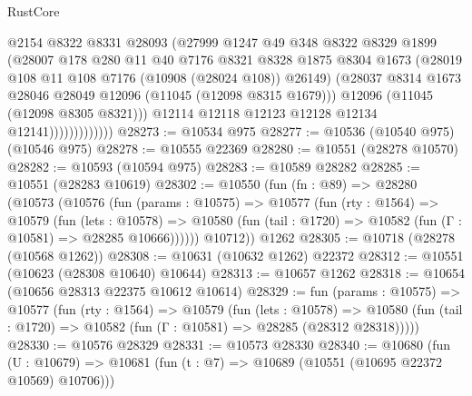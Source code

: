 \begin{lexlean}{RustCore}
\begin{coremodule}
                            @2154
                            @8322
                            @8331
                            @28093
                            (@27999
                              @1247
                              @49
                              @348
                              @8322
                              @8329
                              @1899
                              (@28007
                                @178
                                @280
                                @11
                                @40
                                @7176
                                @8321
                                @8328
                                @1875
                                @8304
                                @1673
                                (@28019 @108 @11 @108 @7176 (@10908 (@28024 @108)) @26149)
                                (@28037
                                  @8314
                                  @1673
                                  @28046
                                  @28049
                                  @12096
                                  (@11045 (@12098 @8315 @1679)))
                                @12096
                                (@11045 (@12098 @8305 @8321)))
                              @12114
                              @12118
                              @12123
                              @12128
                              @12134
                              @12141)))))))))))))
@28273 := @10534 @975
@28277 := @10536 (@10540 @975) (@10546 @975)
@28278 := @10555 @22369
@28280 := @10551 (@28278 @10570)
@28282 := @10593 (@10594 @975)
@28283 := @10589 @28282
@28285 := @10551 (@28283 @10619)
@28302 := @10550
    (fun (fn : @89) =>
    @28280
      (@10573
        (@10576
          (fun (params : @10575) =>
          @10577
            (fun (rty : @1564) =>
            @10579
              (fun (lets : @10578) =>
              @10580 (fun (tail : @1720) => @10582 (fun (Γ : @10581) => @28285 @10666))))))
        @10712))
    @1262
@28305 := @10718 (@28278 (@10568 @1262))
@28308 := @10631 (@10632 @1262) @22372
@28312 := @10551 (@10623 (@28308 @10640) @10644)
@28313 := @10657 @1262
@28318 := @10654 (@10656 @28313 @22375 @10612 @10614)
@28329 := fun (params : @10575) =>
  @10577
    (fun (rty : @1564) =>
    @10579
      (fun (lets : @10578) =>
      @10580 (fun (tail : @1720) => @10582 (fun (Γ : @10581) => @28285 (@28312 @28318)))))
@28330 := @10576 @28329
@28331 := @10573 @28330
@28340 := @10680
    (fun (U : @10679) => @10681 (fun (t : @7) => @10689 (@10551 (@10695 @22372 @10569) @10706)))

\end{coremodule}
\end{lexlean}
